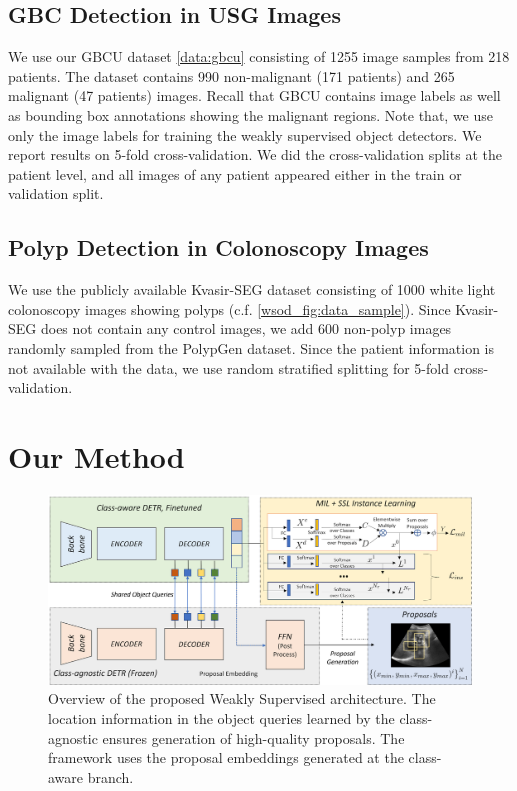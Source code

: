 \subsection{GBC Detection in USG Images}
%
We use our GBCU dataset \cref{data:gbcu} consisting of 1255 image samples from 218 patients. The dataset contains 990 non-malignant (171 patients) and 265 malignant (47 patients) \gb images. Recall that GBCU contains image labels as well as bounding box annotations showing the malignant regions. Note that, we use only the image labels for training the weakly supervised object detectors. We report results on 5-fold cross-validation. We did the cross-validation splits at the patient level, and all images of any patient appeared either in the train or validation split. 

\subsection{Polyp Detection in Colonoscopy Images}
%
We use the publicly available Kvasir-SEG \cite{kvasir} dataset consisting of 1000 white light colonoscopy images showing polyps (c.f. \cref{wsod_fig:data_sample}). Since Kvasir-SEG does not contain any control images, we add 600 non-polyp images randomly sampled from the PolypGen \cite{polypgen} dataset. Since the patient information is not available with the data, we use random stratified splitting for 5-fold cross-validation.

%
%
\section{Our Method}

\begin{figure}[t]
    \centering
    \includegraphics[width=0.9\linewidth]{figs/wsod/arch.png}
    \caption[Overview of the proposed Weakly Supervised \detr architecture]{Overview of the proposed Weakly Supervised \detr architecture. The location information in the object queries learned by the class-agnostic \detr ensures generation of high-quality proposals. The \mil framework uses the proposal embeddings generated at the class-aware branch. }
    \label{wsod_fig:method}
\end{figure}

